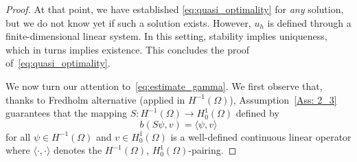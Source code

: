 \documentclass[numbers,webpdf,imaiai]{ima-authoring-template}%
\theoremstyle{thmstyletwo}%
\numberwithin{equation}{section}
\numberwithin{equation}{section}
\begin{document}
{\begin{proof}
At that point, we have established \eqref{eq:quasi_optimality} for \textit{any} solution,
but we do not know yet if such a solution exists.  
However, $u_h$ is defined through a finite-dimensional linear system. 
In this setting, stability implies uniqueness, which in turns implies existence. 
This concludes the proof of~\eqref{eq:quasi_optimality}.

We now turn our attention to~\eqref{eq:estimate_gamma}.  We first observe that, thanks
to Fredholm alternative {(applied in $H^{-1}(\Omega)$)}, Assumption~\ref{Ass: 2_3} guarantees that the mapping
$S: H^{-1}(\Omega) \to H^1_0(\Omega)$ defined by
\begin{equation*}
	b(S\psi,v) = \langle \psi,v \rangle
\end{equation*}
for all $\psi \in H^{-1}(\Omega)$ and $v \in H^1_0(\Omega)$ is a well-defined continuous linear operator
where $\langle\cdot,\cdot\rangle$ denotes the $H^{-1}(\Omega)$, $H_0^1(\Omega)$-pairing.


\end{proof}}
\end{document}
